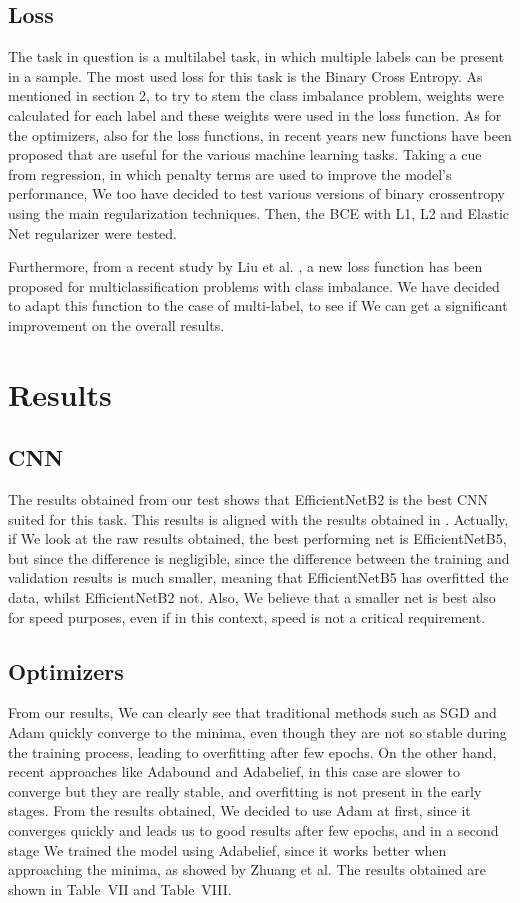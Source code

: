 \documentclass[journal, a4paper]{IEEEtran}
\begin{document}
\subsection{Loss}
The task in question is a multilabel task, in which multiple labels can be present in a sample. The most used loss for this task is the Binary Cross Entropy. As mentioned in section 2, to try to stem the class imbalance problem, weights were calculated for each label and these weights were used in the loss function.
As for the optimizers, also for the loss functions, in recent years new functions have been proposed that are useful for the various machine learning tasks. Taking a cue from regression, in which penalty terms are used to improve the model's performance, We too have decided to test various versions of binary crossentropy using the main regularization techniques. Then, the BCE with L1, L2 and Elastic Net regularizer \cite{ELANET} were tested.

Furthermore, from a recent study by Liu et al. \cite {ELR}, a new loss function has been proposed for multiclassification problems with class imbalance. We have decided to adapt this function to the case of multi-label, to see if We can get a significant improvement on the overall results.

    
\section{Results}

\subsection{CNN}
The results obtained from our test shows that EfficientNetB2 is the best CNN suited for this task. This results is aligned with the results obtained in \cite{CHEXRAY}. Actually, if We look at the raw results obtained, the best performing net is EfficientNetB5, but since the difference is negligible, since the difference between the training and validation results is much smaller, meaning that EfficientNetB5 has overfitted the data, whilst EfficientNetB2 not. Also, We believe that a smaller net is best also for speed purposes, even if in this context, speed is not a critical requirement. 


\subsection{Optimizers}
From our results, We can clearly see that traditional methods such as SGD and Adam quickly converge to the minima, even though they are not so stable during the training process, leading to overfitting after few epochs. On the other hand, recent approaches like Adabound and Adabelief, in this case are slower to converge but they are really stable, and overfitting is not present in the early stages. From the results obtained, We decided to use Adam at first, since it converges quickly and leads us to good results after few epochs, and in a second stage We trained the model using Adabelief, since it works better when approaching the minima, as showed by Zhuang et al. The results obtained are shown in Table~VII and Table~VIII. 
    
\end{document}
